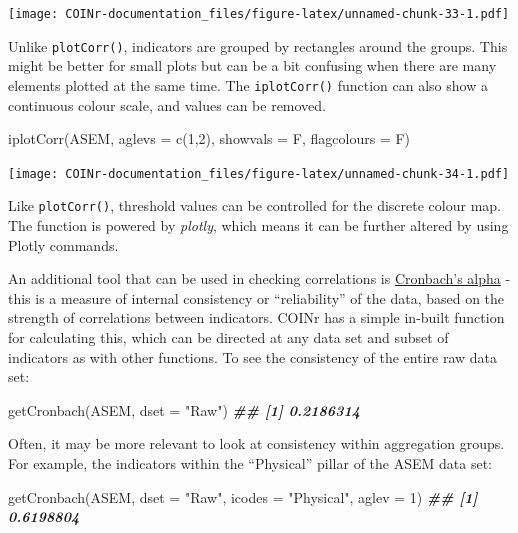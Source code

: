 \documentclass[
]{book}
\newenvironment{Shaded}{\begin{snugshade}}{\end{snugshade}}
\newcommand{\AttributeTok}[1]{\textcolor[rgb]{0.77,0.63,0.00}{#1}}
\newcommand{\DecValTok}[1]{\textcolor[rgb]{0.00,0.00,0.81}{#1}}
\newcommand{\DocumentationTok}[1]{\textcolor[rgb]{0.56,0.35,0.01}{\textbf{\textit{#1}}}}
\newcommand{\FunctionTok}[1]{\textcolor[rgb]{0.00,0.00,0.00}{#1}}
\newcommand{\NormalTok}[1]{#1}
\newcommand{\StringTok}[1]{\textcolor[rgb]{0.31,0.60,0.02}{#1}}
\begin{document}
\texttt{[image: COINr-documentation\_files/figure-latex/unnamed-chunk-33-1.pdf]}

Unlike \texttt{plotCorr()}, indicators are grouped by rectangles around the groups. This might be better for small plots but can be a bit confusing when there are many elements plotted at the same time. The \texttt{iplotCorr()} function can also show a continuous colour scale, and values can be removed.

\begin{Shaded}
\begin{Highlighting}[]
\FunctionTok{iplotCorr}\NormalTok{(ASEM, }\AttributeTok{aglevs =} \FunctionTok{c}\NormalTok{(}\DecValTok{1}\NormalTok{,}\DecValTok{2}\NormalTok{), }\AttributeTok{showvals =}\NormalTok{ F, }\AttributeTok{flagcolours =}\NormalTok{ F)}
\end{Highlighting}
\end{Shaded}

\texttt{[image: COINr-documentation\_files/figure-latex/unnamed-chunk-34-1.pdf]}

Like \texttt{plotCorr()}, threshold values can be controlled for the discrete colour map. The function is powered by \emph{plotly}, which means it can be further altered by using Plotly commands.

An additional tool that can be used in checking correlations is \href{https://en.wikipedia.org/wiki/Cronbach\%27s_alpha}{Cronbach's alpha} - this is a measure of internal consistency or ``reliability'' of the data, based on the strength of correlations between indicators. COINr has a simple in-built function for calculating this, which can be directed at any data set and subset of indicators as with other functions. To see the consistency of the entire raw data set:

\begin{Shaded}
\begin{Highlighting}[]
\FunctionTok{getCronbach}\NormalTok{(ASEM, }\AttributeTok{dset =} \StringTok{"Raw"}\NormalTok{)}
\DocumentationTok{\#\# [1] 0.2186314}
\end{Highlighting}
\end{Shaded}

Often, it may be more relevant to look at consistency within aggregation groups. For example, the indicators within the ``Physical'' pillar of the ASEM data set:

\begin{Shaded}
\begin{Highlighting}[]
\FunctionTok{getCronbach}\NormalTok{(ASEM, }\AttributeTok{dset =} \StringTok{"Raw"}\NormalTok{, }\AttributeTok{icodes =} \StringTok{"Physical"}\NormalTok{, }\AttributeTok{aglev =} \DecValTok{1}\NormalTok{)}
\DocumentationTok{\#\# [1] 0.6198804}
\end{Highlighting}
\end{Shaded}
\end{document}
